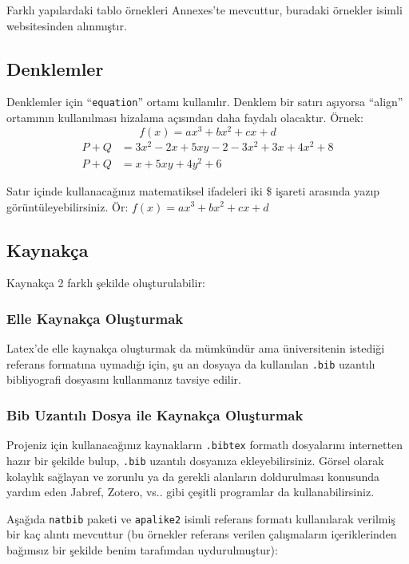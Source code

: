 Farklı yapılardaki tablo örnekleri Annexes'te mevcuttur, buradaki örnekler \cite{latextables} isimli websitesinden alınmıştır.

\subsection{Denklemler}
Denklemler için ``\texttt{equation}'' ortamı kullanılır. Denklem bir satırı aşıyorsa ``align'' ortamının kullanılması hizalama açısından daha faydalı olacaktır. Örnek: 
\begin{equation}\label{eq:birsatir}
f(x) = ax^3 + bx^2 + cx +d
\end{equation}
\begin{align}\label{eq:coksatir}
P+Q &= 3x^2-2x+5xy-2-3x^2+3x+4x^2+8 \\
P+Q &= x+5xy+4y^2+6
\end{align}

Satır içinde kullanacağınız matematiksel ifadeleri iki \$ işareti arasında yazıp görüntüleyebilirsiniz. Ör: $f(x) = ax^3 + bx^2 + cx +d$

\subsection{Kaynakça}
Kaynakça 2 farklı şekilde oluşturulabilir:
\subsubsection{Elle Kaynakça Oluşturmak}
Latex'de elle kaynakça oluşturmak da mümkündür ama üniversitenin istediği referans formatına uymadığı için, şu an dosyaya da kullanılan \texttt{.bib} uzantılı bibliyografi dosyasını kullanmanız tavsiye edilir.

\subsubsection{Bib Uzantılı Dosya ile Kaynakça Oluşturmak}
Projeniz için kullanacağınız kaynakların \texttt{.bibtex} formatlı dosyalarını internetten hazır bir şekilde bulup, \texttt{.bib} uzantılı dosyanıza ekleyebilirsiniz. Görsel olarak kolaylık sağlayan ve zorunlu ya da gerekli alanların doldurulması konusunda yardım eden Jabref, Zotero, vs.. gibi çeşitli programlar da kullanabilirsiniz. 

Aşağıda \texttt{natbib} paketi ve \texttt{apalike2} isimli referans formatı kullanılarak verilmiş bir kaç alıntı mevcuttur (bu örnekler referans verilen çalışmaların içeriklerinden bağımsız bir şekilde benim tarafımdan uydurulmuştur):

